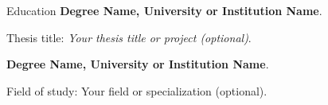 \begin{rubric}{Education}
%
	\normalsize\textbf{Degree Name, University or Institution Name}.\par
	Thesis title: \emph{Your thesis title or project (optional)}.

%
	\normalsize\textbf{Degree Name, University or Institution Name}.\par
	Field of study: Your field or specialization (optional).
\end{rubric}